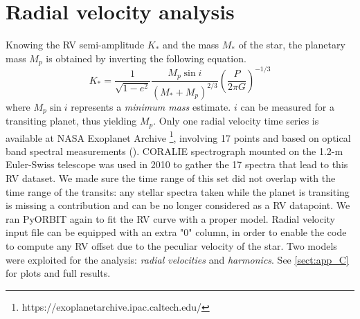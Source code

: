 \documentclass[a4paper,11pt,twocolumn]{article}
\begin{document}
\newpage

\section{Radial velocity analysis}
Knowing the RV semi-amplitude $K_*$ and the mass $M_*$ of the star,
the planetary mass $M_p$ is obtained by inverting the following equation. 
\begin{equation}
    K_* = \frac{1}{\sqrt{1-e^2}}\frac{M_p \sin{i}}{(M_*+M_p)^{2/3}}\left(\frac{P}{2\pi G}\right)^{-1/3}
\end{equation}
where $M_p\sin{i}$ represents a \textit{minimum mass} estimate. $i$ can be 
measured for a transiting planet, thus yielding $M_p$. 
Only one radial velocity time series
is available at NASA Exoplanet Archive \footnote{https://exoplanetarchive.ipac.caltech.edu/}, 
involving 17 points and based on optical band spectral measurements 
(\cite{Anderson}). CORALIE spectrograph mounted on the 1.2-m
Euler-Swiss telescope was used in 2010 to gather the 17 spectra that lead
to this RV dataset. We made sure the time range of this set did not overlap 
with the time range of the transits: any stellar spectra taken while the planet is 
transiting is missing a contribution and can be no longer considered as a RV 
datapoint.
We ran PyORBIT again to fit the RV curve with a proper model. Radial velocity input
file can be equipped with an extra "0" column, in order to enable the code to compute
any RV offset due to the peculiar velocity of the star.
Two models were exploited for the analysis: \textit{radial velocities} and 
\textit{harmonics}. See \ref{sect:app_C} for plots and full results.
\end{document}
